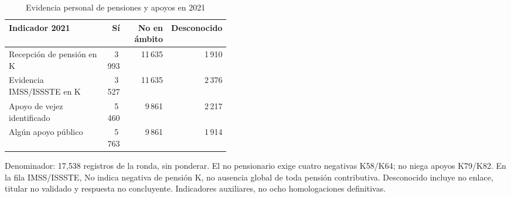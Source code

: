 \begin{table}[!htbp]
\centering
\caption{Evidencia personal de pensiones y apoyos en 2021}\label{tab:integracion-pensiones}
\small\setlength{\tabcolsep}{4pt}
\renewcommand{\arraystretch}{1.15}
\begin{tabular}{p{0.44\linewidth}rrr}
\toprule
\textbf{Indicador 2021} & \textbf{Sí} & \textbf{No en ámbito} & \textbf{Desconocido} \\
\midrule
Recepción de pensión en K & 3\,993 & 11\,635 & 1\,910 \\
Evidencia IMSS/ISSSTE en K & 3\,527 & 11\,635 & 2\,376 \\
Apoyo de vejez identificado & 5\,460 & 9\,861 & 2\,217 \\
Algún apoyo público & 5\,763 & 9\,861 & 1\,914 \\
\bottomrule
\end{tabular}
\par\medskip
\parbox{\linewidth}{\footnotesize Denominador: 17,538 registros de la ronda, sin ponderar. El no pensionario exige cuatro negativas K58/K64; no niega apoyos K79/K82. En la fila IMSS/ISSSTE, No indica negativa de pensión K, no ausencia global de toda pensión contributiva. Desconocido incluye no enlace, titular no validado y respuesta no concluyente. Indicadores auxiliares, no ocho homologaciones definitivas.}
\end{table}
